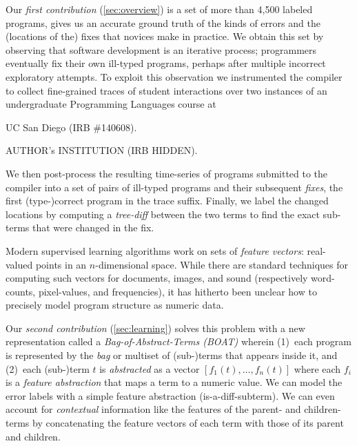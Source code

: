 Our \emph{first contribution} (\autoref{sec:overview})
is a set of more than 4,500 labeled programs,
gives us an accurate ground truth of
the kinds of errors and the (locations
of the) fixes that novices make in
practice.
%
We obtain this set by observing that
software development is an iterative
process; programmers eventually
fix their own ill-typed programs,
perhaps after multiple incorrect
exploratory attempts.
%
To exploit this observation we instrumented
the \ocaml compiler to collect fine-grained
traces of student interactions over two instances
of an undergraduate Programming Languages course at
%
\begin{anonsuppress}
UC San Diego (IRB \#140608).
\end{anonsuppress}
\begin{noanonsuppress}
AUTHOR's INSTITUTION (IRB HIDDEN).
\end{noanonsuppress}
%
We then post-process the resulting time-series
of programs submitted to the \ocaml compiler into
a set of pairs of ill-typed programs and their
subsequent \emph{fixes}, the first (type-)correct
program in the trace suffix.
%
Finally, we label the changed locations by computing a
\emph{tree-diff} between the two terms to find
the exact sub-terms that were changed in the fix.

%
Modern supervised learning algorithms work on sets of
\emph{feature vectors}: real-valued points in an
$n$-dimensional space. While there are standard
techniques for computing such
vectors for documents, images, and sound (respectively
word-counts, pixel-values, and frequencies), it has
hitherto been unclear how to precisely model program
structure as numeric data.

Our \emph{second contribution} (\autoref{sec:learning})
solves this problem with a new representation called
a \emph{Bag-of-Abstract-Terms (BOAT)} wherein
%
(1)~each program is represented by the \emph{bag}
    or multiset of (sub-)terms that appears inside
    it, and
%
(2)~each (sub-)term $t$ is \emph{abstracted} as
    a vector $[f_1(t), \ldots, f_n(t)]$ where
    each $f_i$ is a \emph{feature abstraction}
    that maps a term to a numeric value.
%
We can model the error labels with a simple feature
abstraction (\eg is-a-diff-subterm).
%
We can even account for \emph{contextual} information like
the features of the parent- and children- terms by
concatenating the feature vectors of each term with those
of its parent and children.

